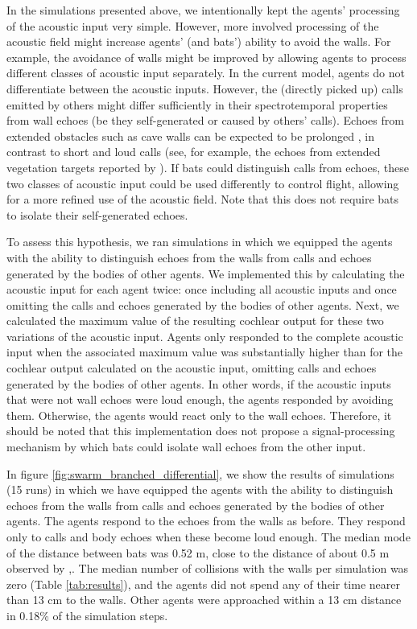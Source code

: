 \documentclass[a4paper, 11pt]{article}
\begin{document}
In the simulations presented above, we intentionally kept the agents' processing of the acoustic input very simple. However, more involved processing of the acoustic field might increase agents' (and bats') ability to avoid the walls. For example, the avoidance of walls might be improved by allowing agents to process different classes of acoustic input separately. In the current model, agents do not differentiate between the acoustic inputs. However, the (directly picked up) calls emitted by others might differ sufficiently in their spectrotemporal properties from wall echoes (be they self-generated or caused by others' calls). Echoes from extended obstacles such as cave walls can be expected to be prolonged \citep{Mazar2024}, in contrast to short and loud calls (see, for example, the echoes from extended vegetation targets reported by \citet{Yovel2009}). If bats could distinguish calls from echoes, these two classes of acoustic input could be used differently to control flight, allowing for a more refined use of the acoustic field. Note that this does not require bats to isolate their self-generated echoes.

To assess this hypothesis, we ran simulations in which we equipped the agents with the ability to distinguish echoes from the walls from calls and echoes generated by the bodies of other agents. We implemented this by calculating the acoustic input for each agent twice: once including all acoustic inputs and once omitting the calls and echoes generated by the bodies of other agents. Next, we calculated the maximum value of the resulting cochlear output for these two variations of the acoustic input. Agents only responded to the complete acoustic input when the associated maximum value was substantially higher than for the cochlear output calculated on the acoustic input, omitting calls and echoes generated by the bodies of other agents. In other words, if the acoustic inputs that were not wall echoes were loud enough, the agents responded by avoiding them. Otherwise, the agents would react only to the wall echoes. Therefore, it should be noted that this implementation does not propose a signal-processing mechanism by which bats could isolate wall echoes from the other input.

In figure \ref{fig:swarm_branched_differential}, we show the results of simulations (15 runs) in which we have equipped the agents with the ability to distinguish echoes from the walls from calls and echoes generated by the bodies of other agents. The agents respond to the echoes from the walls as before. They respond only to calls and body echoes when these become loud enough. The median mode of the distance between bats was 0.52 m, close to the distance of about 0.5 m observed by \citet[][calculated as the mode of the inter-bat distance distribution]{Weesner2023},\citet{Theriault2010}. The median number of collisions with the walls per simulation was zero (Table \ref{tab:results}), and the agents did not spend any of their time nearer than 13 cm to the walls. Other agents were approached within a 13 cm distance in 0.18\% of the simulation steps.
\end{document}
